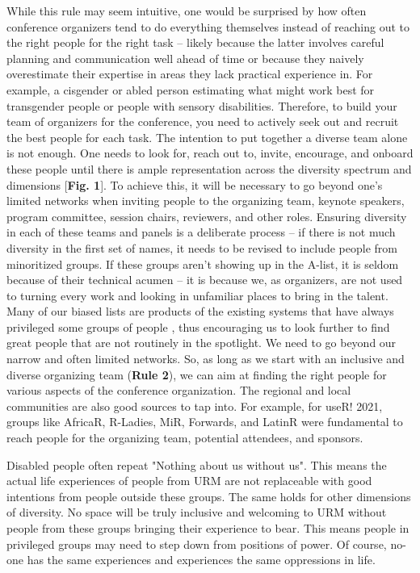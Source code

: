 \documentclass[10pt,letterpaper]{article}
\begin{document}
While this rule may seem intuitive, one would be surprised by how often conference organizers tend to do everything themselves instead of reaching out to the right people for the right task -- likely because the latter involves careful planning and communication well ahead of time or because they naively overestimate their expertise in areas they lack practical experience in. For example, a cisgender or abled person estimating what might work best for transgender people or people with sensory disabilities. 
Therefore, to build your team of organizers for the conference, you need to actively seek out and recruit the best people for each task. The intention to put together a diverse team alone is not enough. One needs to look for, reach out to, invite, encourage, and onboard these people until there is ample representation across the diversity spectrum and dimensions [\textbf{Fig. 1}]. To achieve this, it will be necessary to go beyond one's limited networks when inviting people to the organizing team, keynote speakers, program committee, session chairs, reviewers, and other roles. Ensuring diversity in each of these teams and panels is a deliberate process -- if there is not much diversity in the first set of names, it needs to be revised to include people from minoritized groups. If these groups aren't showing up in the A-list, it is seldom because of their technical acumen -- it is because we, as organizers, are not used to turning every work and looking in unfamiliar places to bring in the talent.  Many of our biased lists are products of the existing systems that have always privileged some groups of people \cite{dwyer_notice_2021, sarabipour_evaluating_2020}, thus encouraging us to look further to find great people that are not routinely in the spotlight. We need to go beyond our narrow and often limited networks. So, as long as we start with an inclusive and diverse organizing team (\textbf{Rule 2}), we can aim at finding the right people for various aspects of the conference organization. The regional and local communities are also good sources to tap into. For example, for useR! 2021, groups like AfricaR, R-Ladies, MiR, Forwards, and LatinR were fundamental to reach people for the organizing team, potential attendees, and sponsors.

Disabled people often repeat "Nothing about us without us". This means the actual life experiences of people from URM are not replaceable with good intentions from people outside these groups. The same holds for other dimensions of diversity. No space will be truly inclusive and welcoming to URM without people from these groups bringing their experience to bear. This means people in privileged groups may need to step down from positions of power. Of course, no-one has the same experiences and experiences the same oppressions in life. %
\end{document}
